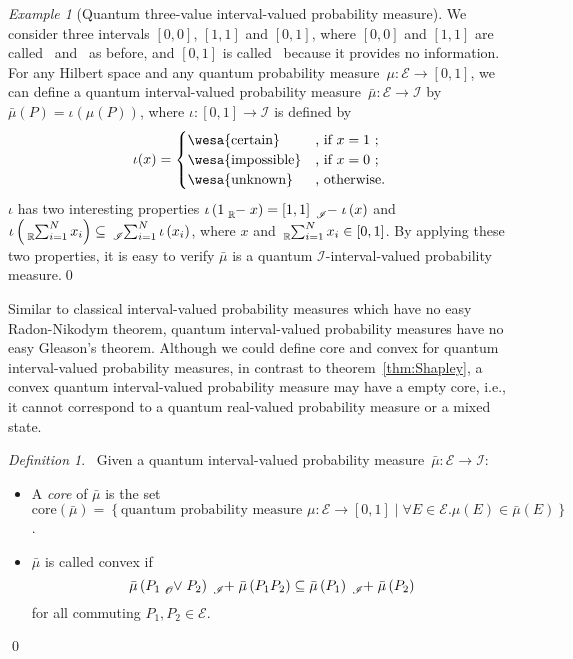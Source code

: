 \documentclass{article}
\theoremstyle{remark}
\newtheorem{example}{Example}
\newtheorem{definition}{Definition}
\newcommand{\events}{\ensuremath{\mathcal{E}}}
\newcommand{\pmeas}{\ensuremath{\mu}}
\newcommand{\imposs}{{\mbox{\wesa{impossible}}}}
\newcommand{\necess}{{\mbox{\wesa{certain}}}}
\newcommand{\unknown}{{\mbox{\wesa{unknown}}}}
\begin{document}
\begin{example}[Quantum three-value interval-valued probability
measure] We consider three intervals\emph{ }$\left[0,0\right]$,
$\left[1,1\right]$ and \emph{$\left[0,1\right]$}, where $\left[0,0\right]$
and $\left[1,1\right]$ are called \imposs~and \necess~as before,
and \emph{$\left[0,1\right]$} is called \unknown~because it provides
no information. For any Hilbert space and any quantum probability
measure~$\mu:\events\rightarrow\left[0,1\right]$, we can define
a quantum interval-valued probability measure~$\bar{\mu}:\events\rightarrow\mathscr{I}$
by $\bar{\mu}(P)=\iota\left(\mu(P)\right)$, where $\iota:\left[0,1\right]\rightarrow\mathscr{I}$
is defined by 
\[
\iota(x)=\begin{cases}
\necess & \textrm{, if }x=1\textrm{ ;}\\
\imposs & \textrm{, if }x=0\textrm{ ;}\\
\unknown & \textrm{, otherwise.}
\end{cases}
\]
$\iota$ has two interesting properties $\iota\left(1\tensor*[_{\mathbb{R}}]{-}{}x\right)=\left[1,1\right]\tensor*[_{\mathscr{I}}]{-}{}\iota\left(x\right)$
and $\iota\left(\tensor*[_{\mathbb{R}}]{\sum}{_{i=1}^{N}}x_{i}\right)\subseteq\tensor*[_{\mathscr{I}}]{\sum}{_{i=1}^{N}}\iota\left(x_{i}\right)$,
where $x$ and $\tensor*[_{\mathbb{R}}]{\sum}{_{i=1}^{N}}x_{i}\in\left[0,1\right]$.
By applying these two properties, it is easy to verify $\bar{\mu}$
is a quantum \emph{$\mathscr{I}$}-interval-valued probability measure.\qed\end{example}

Similar to classical interval-valued probability measures which have
no easy Radon-Nikodym theorem, quantum interval-valued probability
measures have no easy Gleason's theorem. Although we could define
core and convex for quantum interval-valued probability measures,
in contrast to theorem~\ref{thm:Shapley}, a convex quantum interval-valued
probability measure may have a empty core, i.e., it cannot correspond
to a quantum real-valued probability measure or a mixed state.

\begin{definition}~Given a quantum interval-valued probability measure~$\bar{\mu}:\events\rightarrow\mathscr{I}$:
\begin{itemize}
\item A \emph{core} of $\bar{\mu}$ is the set $\mathrm{core}\left(\bar{\mu}\right)=\left\{ \textrm{quantum probability measure }\pmeas:\events\rightarrow[0,1]\middle|\forall E\in\events.\pmeas\left(E\right)\in\bar{\mu}\left(E\right)\right\} $.
\item $\bar{\mu}$ is called convex if 
\begin{equation}
\bar{\mu}\left(P_{1}\tensor*[_{\mathscr{O}}]{\vee}{}P_{2}\right)\tensor*[_{\mathscr{I}}]{+}{}\bar{\mu}\left(P_{1}P_{2}\right)\subseteq\bar{\mu}\left(P_{1}\right)\tensor*[_{\mathscr{I}}]{+}{}\bar{\mu}\left(P_{2}\right)\label{eq:QuantumInterval-valuedProbability-Convex}
\end{equation}
 for all commuting $P_{1},P_{2}\in\events$. 
\end{itemize}
\qed\end{definition}
\end{document}
